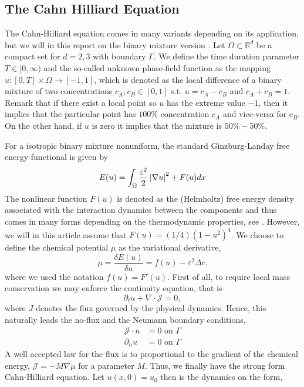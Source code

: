 \subsection{The Cahn Hilliard Equation}%
\label{sub:the_equations}

The Cahn-Hilliard equation comes in many variants depending on its application, but we will in this report on the binary mixture version \cite{miranville2017cahn}. Let $\Omega \subset  \mathbb{R} ^{d} $ be a compact set for $d=2,3$ with boundary
$\Gamma $. We define the time duration parameter $T \in  [0,\infty) $ and the
so-called unknown phase-field function as the
mapping $u: \left[ 0,T \right] \times \Omega  \to \left[ -1,1 \right]  $, which is denoted as the local difference of a binary mixture of two concentrations $c_{A}, c_{B} \in \left[ 0,1\right] $ s.t. $u = c_{A} -c_{B}$ and $c_{A} + c_{B} = 1$. Remark that if there exist a
local point so $u$ has the extreme value $-1$, then it implies that the particular point has $100\%$ concentration $c_{A}$ and vice-versa for $c_{B}$. On the other hand, if $u$ is zero it implies that the mixture is $50\% - 50\%$.

For a isotropic
binary mixture nonuniform, the standard Ginzburg-Landay free energy functional is given by \[
E( u)  = \int_{\Omega }^{} \frac{\varepsilon ^2}{2} \left\lvert  \nabla u  \right\rvert ^2 + F( u) dx
\]
The nonlinear function $F( u) $ is denoted as the (Helmholtz) free energy density associated with the interaction dynamics between the components and thus comes in many forms depending on the thermodynamic properties, see \cite{miranville2017cahn}.
However, we will in this article assume that $F( u) = ( 1 / 4 ) ( 1- u^2) ^{4} $.
We choose to define the chemical potential $\mu $ as the variational derivative,
\[
\mu = \frac{ \delta E( u) }{ \delta  u} = f( u)  - \varepsilon ^{2} \Delta c .
\]
where we used the notation $f( u) = F'( u) $.
First of all, to require local mass conservation we may enforce the continuity equation, that is \[
\partial _{t} u + \nabla \cdot \mathcal{J}  = 0,
\]
where $J$ denotes the flux governed by the physical dynamics. Hence, this naturally leads the no-flux and the Neumann boundary conditions,
\begin{equation}
\label{eq:conservation}
    \begin{split}
\mathcal{J}  \cdot n & = 0 \text{ on } \Gamma \\
\partial _{n} u & = 0 \text{ on } \Gamma
    \end{split}
\end{equation}
 A well accepted law for the flux  is to proportional to the gradient of the chemical energy, $\mathcal{J} = - M  \nabla \mu  $ for a parameter $M$.
Thus, we finally have the strong form Cahn-Hilliard equation. Let $ u( x,0) =  u_{0}$ then is the dynamics on the form,

